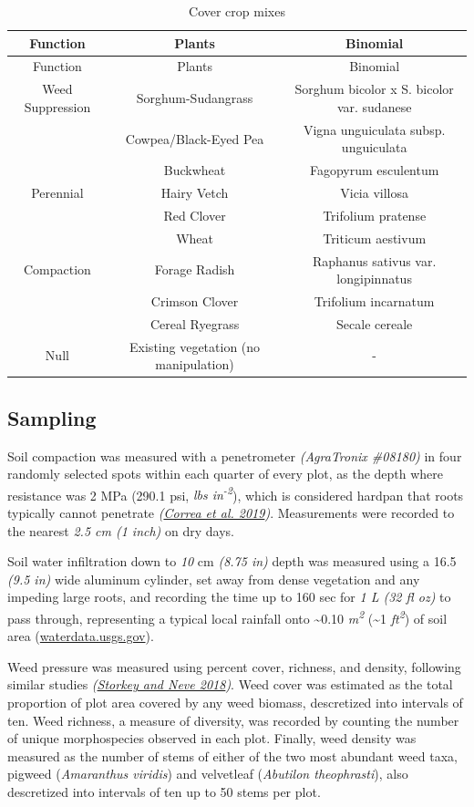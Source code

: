 \documentclass[
]{article}
\begin{document}
\begin{longtable}[]{@{}ccc@{}}
\caption{\label{tab:crops}Cover crop mixes}\tabularnewline
\toprule
Function & Plants & Binomial \\
\midrule
\endfirsthead
\toprule
Function & Plants & Binomial \\
\midrule
\endhead
Weed Suppression & Sorghum-Sudangrass & Sorghum bicolor x S. bicolor var. sudanese \\
& Cowpea/Black-Eyed Pea & Vigna unguiculata subsp. unguiculata \\
& Buckwheat & Fagopyrum esculentum \\
Perennial & Hairy Vetch & Vicia villosa \\
& Red Clover & Trifolium pratense \\
& Wheat & Triticum aestivum \\
Compaction & Forage Radish & Raphanus sativus var. longipinnatus \\
& Crimson Clover & Trifolium incarnatum \\
& Cereal Ryegrass & Secale cereale \\
Null & Existing vegetation (no manipulation) & - \\
\bottomrule
\end{longtable}

\hypertarget{sampling}{%
\subsection{Sampling}\label{sampling}}

Soil compaction was measured with a penetrometer \emph{(AgraTronix \#08180)} in four randomly selected spots within each quarter of every plot, as the depth where resistance was 2 MPa (290.1 psi, \emph{lbs in\textsuperscript{-2}}), which is considered hardpan that roots typically cannot penetrate \emph{(\protect\hyperlink{ref-correa19}{Correa et al. 2019})}.
Measurements were recorded to the nearest \emph{2.5 cm (1 inch)} on dry days.

Soil water infiltration down to \emph{10}
cm \emph{(8.75 in)} depth was measured using a 16.5 \emph{(9.5 in)} wide aluminum cylinder, set away from dense vegetation and any impeding large roots, and recording the time up to 160 sec for \emph{1 L (32 fl oz)} to pass through, representing a typical local rainfall onto \textasciitilde0.10 \emph{m\textsuperscript{2}} (\textasciitilde1 \emph{ft\textsuperscript{2}}) of soil area (\url{waterdata.usgs.gov}).

Weed pressure was measured using percent cover, richness, and density, following similar studies \emph{(\protect\hyperlink{ref-storkey18}{Storkey and Neve 2018})}.
Weed cover was estimated as the total proportion of plot area covered by any weed biomass, descretized into intervals of ten.
Weed richness, a measure of diversity, was recorded by counting the number of unique morphospecies observed in each plot.
Finally, weed density was measured as the number of stems of either of the two most abundant weed taxa, pigweed (\emph{Amaranthus viridis}) and velvetleaf (\emph{Abutilon theophrasti}), also descretized into intervals of ten up to 50 stems per plot.
\end{document}

